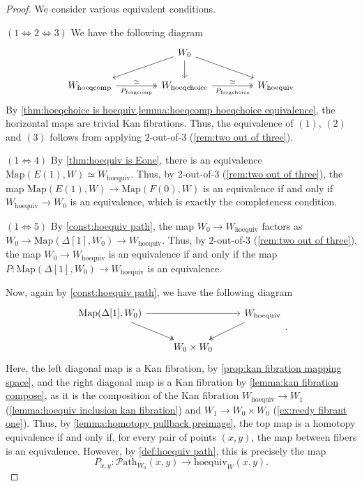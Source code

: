\documentclass[11pt, a4paper]{amsart}
\newcommand{\Map}{\mathrm{Map}}
\newcommand{\hoequiv}{\mathrm{hoequiv}}
\newcommand{\hoeqchoice}{\mathrm{hoeqchoice}}
\newcommand{\hoeqcomp}{\mathrm{hoeqcomp}}
\newcommand{\forgcomp}{\mathrm{forgcomp}}
\newcommand{\forgchoice}{\mathrm{forgchoice}}
\newcommand{\Path}{\mathscr{P}\mathrm{ath}}
\theoremstyle{definition}
\theoremstyle{remark}
\numberwithin{equation}{section}
\begin{document}
 \begin{proof}
  We consider various equivalent conditions.
  
  \emph{$(1 \Longleftrightarrow 2 \Longleftrightarrow 3)$} 
  We have the following diagram
  \[
  \begin{tikzcd}[column sep=1.5cm]
    & W_0 \arrow[dl] \arrow[d] \arrow[dr] & \\
    W_{\hoeqcomp} \arrow[r, "P_{\forgcomp}"', twoheadrightarrow, "\simeq"] & W_{\hoeqchoice} \arrow[r, "P_{\forgchoice}"', twoheadrightarrow, "\simeq"] & W_{\hoequiv}
  \end{tikzcd}
  \]
  By \cref{thm:hoeqchoice is hoequiv,lemma:hoeqcomp hoeqchoice equivalence}, the horizontal maps are trivial Kan fibrations. Thus, the equivalence of $(1)$, $(2)$ and $(3)$ follows from applying $2$-out-of-$3$ (\cref{rem:two out of three}).
  
  \emph{$(1 \Longleftrightarrow 4)$}
  By \cref{thm:hoequiv is Eone}, there is an equivalence $\Map(E(1),W) \simeq W_{\hoequiv}$. Thus, by $2$-out-of-$3$ (\cref{rem:two out of three}), the map $\Map(E(1),W) \to \Map(F(0),W)$ is an equivalence if and only if $W_{\hoequiv} \to W_0$ is an equivalence, which is exactly the completeness condition.
  
  \emph{$(1 \Longleftrightarrow 5)$}
  By \cref{const:hoequiv path}, the map $W_0 \to W_{\hoequiv}$ factors as $W_0 \to \Map(\Delta[1],W_0) \to W_{\hoequiv}$. Thus, by $2$-out-of-$3$ (\cref{rem:two out of three}), the map $W_0 \to W_{\hoequiv}$ is an equivalence if and only if the map $P\colon\Map(\Delta[1],W_0) \to W_{\hoequiv}$ is an equivalence. 

  Now, again by \cref{const:hoequiv path}, we have the following diagram 
  \[
  \begin{tikzcd}
    {\Map(\Delta[1],W_0)} \arrow[dr, twoheadrightarrow] \arrow[rr] & & W_{\hoequiv} \arrow[dl, twoheadrightarrow] \\
    & W_0 \times W_0 
  \end{tikzcd}.
  \]
  Here, the left diagonal map is a Kan fibration, by \cref{prop:kan fibration mapping space}, and the right diagonal map is a Kan fibration by \cref{lemma:kan fibration compose}, as it is the composition of the Kan fibration $W_{\hoequiv} \to W_1$ (\cref{lemma:hoequiv inclusion kan fibration}) and $W_1 \to W_0 \times W_0$ (\cref{ex:reedy fibrant one}). Thus, by \cref{lemma:homotopy pullback preimage}, the top map is a homotopy equivalence if and only if, for every pair of points $(x,y)$, the map between fibers is an equivalence. However, by \cref{def:hoequiv path}, this is precisely the map 
  \[ P_{x,y}\colon \Path_{W_0}(x,y) \to \hoequiv_W(x,y).\]
 \end{proof}
\end{document}
